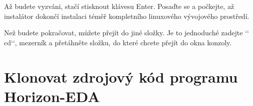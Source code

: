 \documentclass[letterpaper,10pt,czech]{sphinxmanual}
\begin{document}
\begin{sphinxVerbatim}[commandchars=\\\{\}]
     \PYGZbs{}
  \PYGZbs{}
  \PYGZbs{}
   \PYGZbs{}
  \PYGZbs{}
 
\end{sphinxVerbatim}

Až budete vyzváni, stačí stisknout klávesu Enter. Posaďte se a počkejte, až instalátor dokončí
instalaci téměř kompletního linuxového vývojového prostředí.

Než budete pokračovat, můžete přejít do jiné složky. Je to jednoduché
zadejte {}`{}` cd{}`{}`, mezerník a přetáhněte složku, do které chcete přejít
do okna konzoly.


\section{Klonovat zdrojový kód programu Horizon-EDA}
\label{\detokenize{build-win32_cz:klonovat-zdrojovy-kod-programu-horizon-eda}}
\begin{sphinxVerbatim}[commandchars=\\\{\}]
  
 
\end{sphinxVerbatim}
\end{document}

